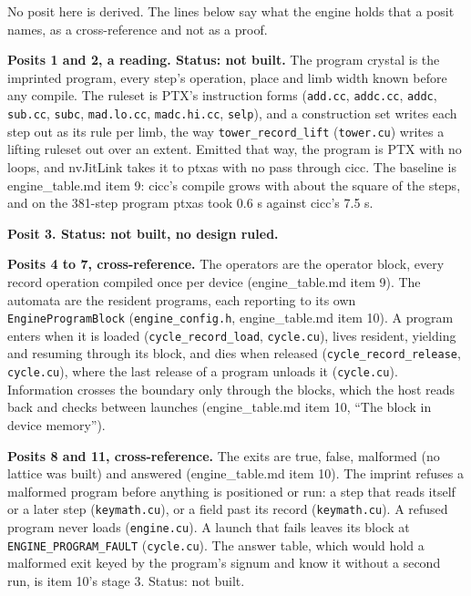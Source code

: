 No posit here is derived. The lines below say what the engine holds that a posit names, as a cross-reference and not as a proof.

\textbf{Posits 1 and 2, a reading. Status: not built.} The program crystal is the imprinted program, every step's operation, place and limb width known before any compile. The ruleset is PTX's instruction forms (\texttt{add.\allowbreak{}cc}, \texttt{addc.\allowbreak{}cc}, \texttt{addc}, \texttt{sub.\allowbreak{}cc}, \texttt{subc}, \texttt{mad.\allowbreak{}lo.\allowbreak{}cc}, \texttt{madc.\allowbreak{}hi.\allowbreak{}cc}, \texttt{selp}), and a construction set writes each step out as its rule per limb, the way \texttt{tower\_\allowbreak{}record\_\allowbreak{}lift} (\texttt{tower.\allowbreak{}cu}) writes a lifting ruleset out over an extent. Emitted that way, the program is PTX with no loops, and nvJitLink takes it to ptxas with no pass through cicc. The baseline is engine\_\allowbreak{}table.md item 9: cicc's compile grows with about the square of the steps, and on the 381-step program ptxas took 0.6 s against cicc's 7.5 s.

\textbf{Posit 3. Status: not built, no design ruled.}

\textbf{Posits 4 to 7, cross-reference.} The operators are the operator block, every record operation compiled once per device (engine\_\allowbreak{}table.md item 9). The automata are the resident programs, each reporting to its own \texttt{Engine\allowbreak{}Program\allowbreak{}Block} (\texttt{engine\_\allowbreak{}config.\allowbreak{}h}, engine\_\allowbreak{}table.md item 10). A program enters when it is loaded (\texttt{cycle\_\allowbreak{}record\_\allowbreak{}load}, \texttt{cycle.\allowbreak{}cu}), lives resident, yielding and resuming through its block, and dies when released (\texttt{cycle\_\allowbreak{}record\_\allowbreak{}release}, \texttt{cycle.\allowbreak{}cu}), where the last release of a program unloads it (\texttt{cycle.\allowbreak{}cu}). Information crosses the boundary only through the blocks, which the host reads back and checks between launches (engine\_\allowbreak{}table.md item 10, “The block in device memory”).

\textbf{Posits 8 and 11, cross-reference.} The exits are true, false, malformed (no lattice was built) and answered (engine\_\allowbreak{}table.md item 10). The imprint refuses a malformed program before anything is positioned or run: a step that reads itself or a later step (\texttt{keymath.\allowbreak{}cu}), or a field past its record (\texttt{keymath.\allowbreak{}cu}). A refused program never loads (\texttt{engine.\allowbreak{}cu}). A launch that fails leaves its block at \texttt{ENGINE\_\allowbreak{}PROGRAM\_\allowbreak{}FAULT} (\texttt{cycle.\allowbreak{}cu}). The answer table, which would hold a malformed exit keyed by the program's signum and know it without a second run, is item 10's stage 3. Status: not built.


